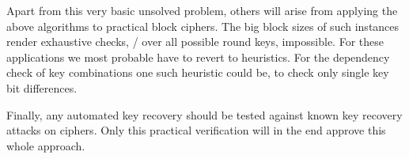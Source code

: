 Apart from this very basic unsolved problem, others will arise from applying the above algorithms to practical block ciphers.
The big block sizes of such instances render exhaustive checks, \eg/ over all possible round keys, impossible.
For these applications we most probable have to revert to heuristics.
For the dependency check of key combinations one such heuristic could be, to check only single key bit differences.

Finally, any automated key recovery should be tested against known key recovery attacks on ciphers.
Only this practical verification will in the end approve this whole approach.

%
%
%
%
%
